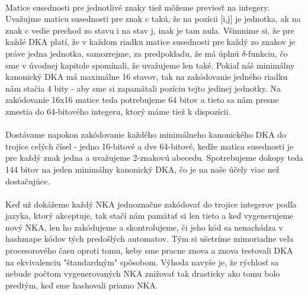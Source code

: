 \paragraph{}
Matice susednosti pre jednotlivé znaky tiež môžeme previesť na integery. Uvažujme maticu susednosti pre znak c takú, že na pozícii [i,j] je jednotka, ak na znak c vedie prechod zo stavu i na stav j, inak je tam nula. Všimnime si, že pre každé DKA platí, že v každom riadku matice susednosti pre každý zo znakov je práve jedna jednotka, samozrejme, za predpokladu, že má úplnú $\delta$-funkciu, čo sme v úvodnej kapitole spomínali, že uvažujeme len také. Pokiaľ náš minimálny kanonický DKA má maximálne 16 stavov, tak na zakódovanie jedného riadku nám stačia 4 bity - aby sme si zapamätali pozíciu tejto jedinej jednotky. Na zakódovanie 16x16 matice teda potrebujeme 64 bitov a tieto sa nám presne zmestia do 64-bitového integeru, ktorý máme tiež k dispozícii.
\paragraph{}
Dostávame napokon zakódovanie každého minimálneho kanonického DKA do trojice celých čísel - jedno 16-bitové a dve 64-bitové, keďže matica susednosti je pre každý znak jedna a uvažujeme 2-znakovú abecedu. Spotrebujeme dokopy teda 144 bitov na jeden minimálny kanonický DKA, čo je na naše účely viac než dostačujúce.
\paragraph{}
Keď už dokážeme každý NKA jednoznačne zakódovať do trojice integerov podľa jazyka, ktorý akceptuje, tak stačí nám pamätať si len tieto a keď vygenerujeme nový NKA, len ho zakódujeme a skontrolujeme, či jeho kód sa nenachádza v hashmape kódov tých predošlých automatov. Tým si ušetríme mimoriadne veľa procesorového času oproti tomu, keby sme pracne znova a znova testovali DKA na ekvivalenciu "štandardným" spôsobom. Výhoda navyše je, že rýchlosť sa nebude počtom vygenerovaných NKA znižovať tak drasticky ako tomu bolo predtým, keď sme hashovali priamo NKA.








